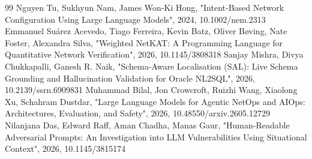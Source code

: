 \documentclass[conference]{IEEEtran}
\begin{document}
\begin{thebibliography}{99}
 Nguyen Tu, Sukhyun Nam, James Won‐Ki Hong, "Intent‐Based Network Configuration Using Large Language Models", 2024, 10.1002/nem.2313
 Emmanuel Suárez Acevedo, Tiago Ferreira, Kevin Batz, Oliver Bøving, Nate Foster, Alexandra Silva, "Weighted NetKAT: A Programming Language for Quantitative Network Verification", 2026, 10.1145/3808318
 Sanjay Mishra, Divya Chukkapalli, Ganesh R. Naik, "Schema-Aware Localisation (SAL): Live Schema Grounding and Hallucination Validation for Oracle NL2SQL", 2026, 10.2139/ssrn.6909831
 Muhammad Bilal, Jon Crowcroft, Ruizhi Wang, Xiaolong Xu, Schahram Dustdar, "Large Language Models for Agentic NetOps and AIOps: Architectures, Evaluation, and Safety", 2026, 10.48550/arxiv.2605.12729
 Nilanjana Das, Edward Raff, Aman Chadha, Manas Gaur, "Human-Readable Adversarial Prompts: An Investigation into LLM Vulnerabilities Using Situational Context", 2026, 10.1145/3815174
\end{thebibliography}
\end{document}
